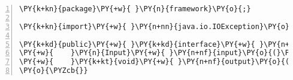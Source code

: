 \begin{Verbatim}[commandchars=\\\{\},numbers=left,firstnumber=1,stepnumber=1,frame=single,fontsize=\small]
\PY{k+kn}{package}\PY{+w}{ }\PY{n}{framework}\PY{o}{;}

\PY{k+kn}{import}\PY{+w}{ }\PY{n+nn}{java.io.IOException}\PY{o}{;}

\PY{k+kd}{public}\PY{+w}{ }\PY{k+kd}{interface}\PY{+w}{ }\PY{n+nc}{InputAndOutput}\PY{+w}{ }\PY{o}{\PYZob{}}
\PY{+w}{    }\PY{n}{Input}\PY{+w}{ }\PY{n+nf}{input}\PY{o}{(}\PY{o}{)}\PY{+w}{ }\PY{k+kd}{throws}\PY{+w}{ }\PY{n}{IOException}\PY{o}{;}
\PY{+w}{    }\PY{k+kt}{void}\PY{+w}{ }\PY{n+nf}{output}\PY{o}{(}\PY{n}{Output}\PY{+w}{ }\PY{n}{output}\PY{o}{)}\PY{o}{;}
\PY{o}{\PYZcb{}}
\end{Verbatim}
